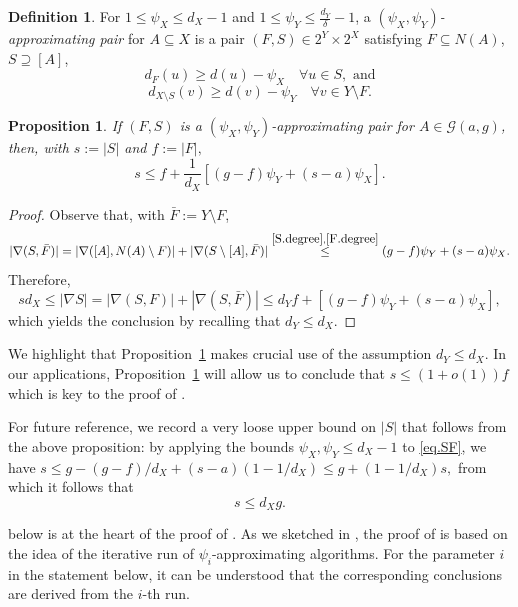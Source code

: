 \documentclass[10pt,a4paper]{amsart}
\newtheorem{prop}[thm]{Proposition}
\theoremstyle{definition}
\newtheorem{mydef}[thm]{Definition}
\newcommand{\cG}{\mathcal{G} }
\newcommand{\beq}[1]{\begin{equation}\label{#1}}
\newcommand{\enq}[0]{\end{equation}}
\newcommand{\sub}[0]{\subseteq}
\newcommand{\0}[0]{\emptyset}
\begin{document}
\begin{mydef}\label{def:psi-approximation}
    For $1 \le \psi_X\leq d_X-1$ and $1\leq \psi_Y \le \frac{d_Y}{\delta}-1$, a \textit{$(\psi_X, \psi_Y)$-approximating pair} for $A \sub X$ is a pair $(F,S) \in 2^Y \times 2^X$ satisfying $F \sub N(A)$, $S \supseteq [A]$,
    \beq{S.degree} d_F(u) \ge d(u)-\psi_X \quad \forall u \in S, \text{ and}\enq
    \beq{F.degree} d_{X \setminus S}(v) \ge d(v)-\psi_Y \quad \forall v \in Y \setminus F.\enq
\end{mydef}

\begin{prop}\label{SF_size}
    If $(F,S)$ is a $(\psi_X, \psi_Y)$-approximating pair for $A \in \cG(a,g)$, then, with $s:=|S|$ and $f:=|F|,$
    \beq{eq.SF} s \le f+\frac{1}{d_X}[(g-f)\psi_Y+(s-a)\psi_X].\enq
\end{prop}

\begin{proof}
Observe that, with $\bar F:=Y \setminus F$,
\[|\nabla(S, \bar F)|=|\nabla([A], N(A) \setminus F)|+|\nabla(S \setminus [A], \bar F)| \stackrel{\eqref{S.degree},\eqref{F.degree}}{\le} (g-f)\psi_Y+(s-a)\psi_X.\]
Therefore,
\[s d_X\leq|\nabla S|=|\nabla(S,F)|+|\nabla(S, \bar F)| \le d_Y f+[(g-f)\psi_Y+(s-a)\psi_X],\]
which yields the conclusion by recalling that $d_Y\leq d_X$.
\end{proof}

We highlight that Proposition~\ref{SF_size} makes crucial use of the assumption $d_Y\leq d_X$. In our applications, Proposition~\ref{SF_size} will allow us to conclude that $s \le (1+o(1))f$ which is key to the proof of .

For future reference, we record a very loose upper bound on $|S|$ that follows from the above proposition: by applying the bounds $\psi_X, \psi_Y\leq d_X-1$ to \eqref{eq.SF}, we have $s \le g-(g-f)/d_X+(s-a)(1-1/d_X)\le g+(1-1/d_X)s,$ from which it follows that
\beq{s_loose} s \le d_Xg. \enq

 below is at the heart of the proof of . As we sketched in , the proof of  is based on the idea of the iterative run of $\psi_i$-approximating algorithms. For the parameter $i$ in the statement below, it can be understood that the corresponding conclusions are derived from the $i$-th run.
\end{document}
